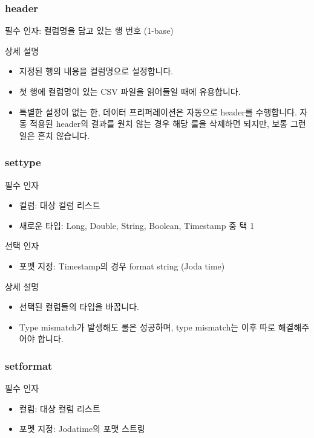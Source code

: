 \documentclass[letterpaper,10pt,english]{sphinxmanual}
\begin{document}
\subsubsection{header}
\label{\detokenize{discovery/part07/rule_kinds:header}}
필수 인자: 컬럼명을 담고 있는 행 번호 (1-base)

상세 설명
\begin{itemize}
\item {} 
지정된 행의 내용을 컬럼명으로 설정합니다.

\item {} 
첫 행에 컬럼명이 있는 CSV 파일을 읽어들일 때에 유용합니다.

\item {} 
특별한 설정이 없는 한, 데이터 프리퍼레이션은 자동으로 header를 수행합니다. 자동 적용된 header의 결과를 원치 않는 경우 해당 룰을 삭제하면 되지만, 보통 그런 일은 흔치 않습니다.

\end{itemize}


\subsubsection{settype}
\label{\detokenize{discovery/part07/rule_kinds:settype}}
필수 인자
\begin{itemize}
\item {} 
컬럼: 대상 컬럼 리스트

\item {} 
새로운 타입: Long, Double, String, Boolean, Timestamp 중 택 1

\end{itemize}

선택 인자
\begin{itemize}
\item {} 
포멧 지정: Timestamp의 경우 format string (Joda time)

\end{itemize}

상세 설명
\begin{itemize}
\item {} 
선택된 컬럼들의 타입을 바꿉니다.

\item {} 
Type mismatch가 발생해도 룰은 성공하며, type mismatch는 이후 따로 해결해주어야 합니다.

\end{itemize}


\subsubsection{setformat}
\label{\detokenize{discovery/part07/rule_kinds:setformat}}
필수 인자
\begin{itemize}
\item {} 
컬럼: 대상 컬럼 리스트

\item {} 
포멧 지정: Jodatime의 포맷 스트링

\end{itemize}
\end{document}
